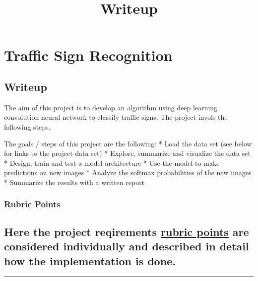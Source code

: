 \documentclass[11pt]{article}
\title{Writeup}
\begin{document}
    
    
    \maketitle
    
    

    
    \section{\texorpdfstring{\textbf{Traffic Sign
Recognition}}{Traffic Sign Recognition}}\label{traffic-sign-recognition}

\subsection{Writeup}\label{writeup}

The aim of this project is to develop an algorithm using deep learning
convolution neural network to classify traffic signs. The project invols
the following steps.

The goals / steps of this project are the following: * Load the data set
(see below for links to the project data set) * Explore, summarize and
visualize the data set * Design, train and test a model architecture *
Use the model to make predictions on new images * Analyze the softmax
probabilities of the new images * Summarize the results with a written
report

\subsubsection{Rubric Points}\label{rubric-points}

\subsection{\texorpdfstring{Here the project reqirements
\href{https://review.udacity.com/\#!/rubrics/481/view}{rubric points}
are considered individually and described in detail how the
implementation is
done.}{Here the project reqirements rubric points are considered individually and described in detail how the implementation is done.}}\label{here-the-project-reqirements-rubric-points-are-considered-individually-and-described-in-detail-how-the-implementation-is-done.}

\begin{center}\rule{0.5\linewidth}{\linethickness}\end{center}
\end{document}
